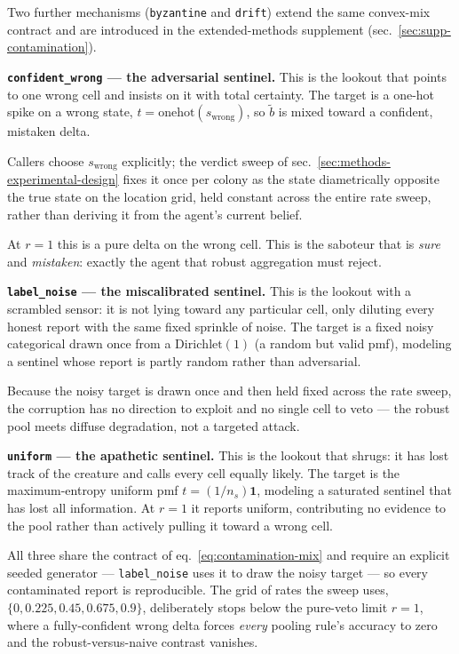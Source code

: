 \documentclass[
  english,
]{article}
\theoremstyle{plain}
\theoremstyle{definition}
\theoremstyle{remark}
\theoremstyle{definition}
\begin{document}
Two further mechanisms (\texttt{byzantine} and \texttt{drift}) extend
the same convex-mix contract and are introduced in the extended-methods
supplement (sec.~\ref{sec:supp-contamination}).

\textbf{\texttt{confident\_wrong} --- the adversarial sentinel.} This is
the lookout that points to one wrong cell and insists on it with total
certainty. The target is a one-hot spike on a wrong state,
\(t = \mathrm{onehot}(s_{\text{wrong}})\), so \(\tilde b\) is mixed
toward a confident, mistaken delta.

Callers choose \(s_{\text{wrong}}\) explicitly; the verdict sweep of
sec.~\ref{sec:methods-experimental-design} fixes it once per colony as
the state diametrically opposite the true state on the location grid,
held constant across the entire rate sweep, rather than deriving it from
the agent's current belief.

At \(r = 1\) this is a pure delta on the wrong cell. This is the
saboteur that is \emph{sure} and \emph{mistaken}: exactly the agent that
robust aggregation must reject.

\textbf{\texttt{label\_noise} --- the miscalibrated sentinel.} This is
the lookout with a scrambled sensor: it is not lying toward any
particular cell, only diluting every honest report with the same fixed
sprinkle of noise. The target is a fixed noisy categorical drawn once
from a \(\mathrm{Dirichlet}(1)\) (a random but valid pmf), modeling a
sentinel whose report is partly random rather than adversarial.

Because the noisy target is drawn once and then held fixed across the
rate sweep, the corruption has no direction to exploit and no single
cell to veto --- the robust pool meets diffuse degradation, not a
targeted attack.

\textbf{\texttt{uniform} --- the apathetic sentinel.} This is the
lookout that shrugs: it has lost track of the creature and calls every
cell equally likely. The target is the maximum-entropy uniform pmf
\(t = (1/n_s)\mathbf{1}\), modeling a saturated sentinel that has lost
all information. At \(r = 1\) it reports uniform, contributing no
evidence to the pool rather than actively pulling it toward a wrong
cell.

All three share the contract of eq.~\ref{eq:contamination-mix} and
require an explicit seeded generator --- \texttt{label\_noise} uses it
to draw the noisy target --- so every contaminated report is
reproducible. The grid of rates the sweep uses,
\(\{0, 0.225, 0.45, 0.675, 0.9\}\), deliberately stops below the
pure-veto limit \(r = 1\), where a fully-confident wrong delta forces
\emph{every} pooling rule's accuracy to zero and the robust-versus-naive
contrast vanishes.
\end{document}
